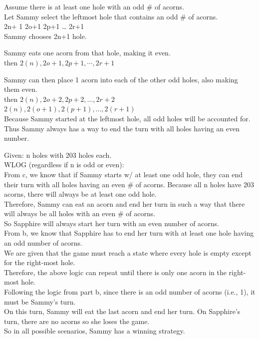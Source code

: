 \documentclass[12pt]{exam}
\begin{document}
\begin{solution}
\begin{qparts}
\item 
Assume there is at least one hole with an odd \# of acorns.\\
Let Sammy select the leftmost hole that contains an odd \# of acorns.\\
2n+ 1 2o+1 2p+1 … 2r+1\\
Sammy chooses 2n+1 hole.

Sammy eats one acorn from that hole, making it even.\\ 
then $2(n), 2o+1, 2p+1,\cdots,2r+1$

Sammy can then place 1 acorn into each of the other odd holes, also making them even. \\
then $2(n), 2o+2, 2p+2, … ,2r+2$\\
$2(n), 2(o+1), 2(p+1), … ,2(r+1)$
\\Because Sammy started at the leftmost hole, all odd holes will be accounted for. \\
Thus Sammy always has a way to end the turn with all holes having an even number.

\item  
Given: n holes with 203 holes each.\\
WLOG (regardless if n is odd or even):\\
From c, we know that if Sammy starts w/ at least one odd hole, they can end their turn with all holes having an even \# of acorns. Because all n holes have 203 acorns, there will always be at least one odd hole.\\
Therefore, Sammy can eat an acorn and end her turn in such a way that there will always be all holes with an even \# of acorns.\\
So Sapphire will always start her turn with an even number of acorns.\\
From b, we know that Sapphire has to end her turn with at least one hole having an odd number of acorns.\\
We are given that the game must reach a state where every hole is empty except for the right-most hole.\\
Therefore, the above logic can repeat until there is only one acorn in the right-most hole.\\
Following the logic from part b, since there is an odd number of acorns (i.e., 1), it must be Sammy’s turn.\\
On this turn, Sammy will eat the last acorn and end her turn. 
On Sapphire’s turn, there are no acorns so she loses the game.
\\So in all possible scenarios, Sammy has a winning strategy.
\end{qparts}
\end{solution}
\end{document}
